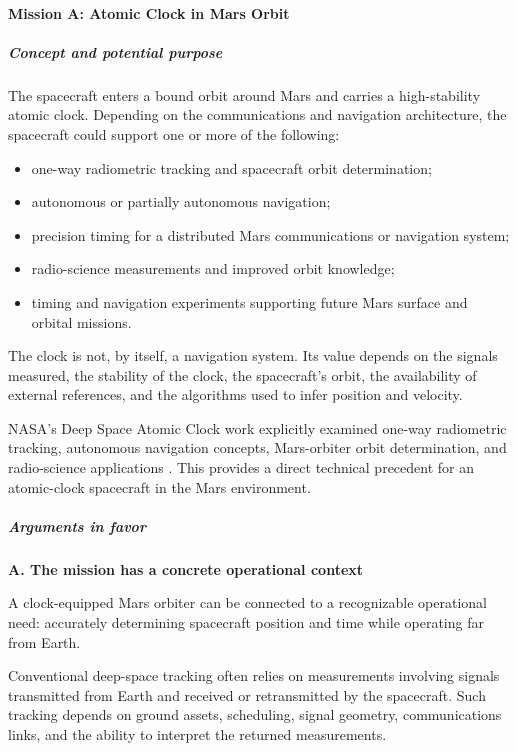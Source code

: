 \paragraph{Mission A: Atomic Clock in Mars Orbit}

\subparagraph{Concept and potential purpose}

The spacecraft enters a bound orbit around Mars and carries a
high-stability atomic clock. Depending on the communications and
navigation architecture, the spacecraft could support one or more
of the following:

\begin{itemize}
	\item one-way radiometric tracking and spacecraft orbit
	      determination;
	\item autonomous or partially autonomous navigation;
	\item precision timing for a distributed Mars communications
	      or navigation system;
	\item radio-science measurements and improved orbit knowledge;
	\item timing and navigation experiments supporting future
	      Mars surface and orbital missions.
\end{itemize}

The clock is not, by itself, a navigation system. Its value depends
on the signals measured, the stability of the clock, the spacecraft's
orbit, the availability of external references, and the algorithms
used to infer position and velocity.

NASA's Deep Space Atomic Clock work explicitly examined one-way
radiometric tracking, autonomous navigation concepts, Mars-orbiter
orbit determination, and radio-science applications
\cite{DSACNavigation}. This provides a direct technical precedent
for an atomic-clock spacecraft in the Mars environment.

\subparagraph{Arguments in favor}

\textbf{A. The mission has a concrete operational context}

A clock-equipped Mars orbiter can be connected to a recognizable
operational need: accurately determining spacecraft position and
time while operating far from Earth.

Conventional deep-space tracking often relies on measurements
involving signals transmitted from Earth and received or retransmitted
by the spacecraft. Such tracking depends on ground assets, scheduling,
signal geometry, communications links, and the ability to interpret
the returned measurements.

